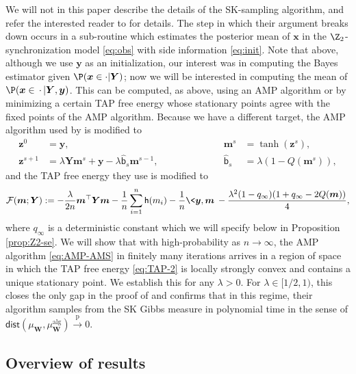 \documentclass[]{article}
\def\bx{{\boldsymbol x}}
\def\by{{\boldsymbol y}}
\def\bW{{\boldsymbol W}}
\def\cF{{\mathcal F}}
\def\bz{{\boldsymbol z}}
\def\bx{{\boldsymbol x}}
\def\by{{\boldsymbol y}}
\def\bW{{\boldsymbol W}}
\def\cF{{\mathcal F}}
\def\bz{{\boldsymbol z}}
\def\bY{{\boldsymbol Y}}
\def\bbm{{\boldsymbol m}}
\def\sh{{\mathsf h}}
\def\pconv{\stackrel{\mathrm{p}}\rightarrow}
\def\sbhat{\widehat{\mathsf{b}}{}}
\def\alg{\mathrm{alg}}
\def\dist{\mathsf{dist}}
\begin{document}
We will not in this paper describe the details of the SK-sampling algorithm, and refer the interested reader to \cite{AlaouiMontanariSelke2022} for details.
The step in which their argument breaks down occurs in a sub-routine which estimates the posterior mean of $\bx$ in the $\Z_2$-synchronization model \eqref{eq:obs} with side information \eqref{eq:init}.
Note that above, although we use $\by$ as an initialization, 
our interest was in computing the Bayes estimator given $\P(\bx \in \cdot | \bY)$;
now we will be interested in computing the mean of $\P(\bx \in \,\cdot\, | \bY , \by)$.
This can be computed,
as above, using an AMP algorithm or by minimizing a certain TAP free energy whose stationary points agree with the fixed points of the AMP algorithm.
Because we have a different target, 
the AMP algorithm used by \cite{AlaouiMontanariSelke2022} is modified to
\begin{equation}\label{eq:AMP-AMS}
\begin{aligned}
    \bz^0 &= \by,
    \qquad\qquad\qquad&
    \bbm^s &= \tanh(\bz^s),
    \\
    \bz^{s+1} &= \lambda \bY \bbm^s + \by - \lambda \sbhat_s\bbm^{s-1},
    \qquad\qquad\qquad
    &
    \sbhat_s &= \lambda(1 - Q(\bbm^s)),
\end{aligned}
\end{equation}
and the TAP free energy they use is modified to
\begin{equation}
\label{eq:TAP-2}
    \cF(\bbm;\bY)   
        := 
        - \frac{\lambda}{2n} \bbm^\top \bY \bbm
        - \frac1n \sum_{i=1}^n \sh(m_i) 
        - \frac1n \< \by,\bbm\>
        - \frac{\lambda^2(1-q_\infty)(1+q_\infty-2Q(\bbm))}{4},
\end{equation}
where $q_\infty$ is a deterministic constant which we will specify below in Proposition \ref{prop:Z2-se}.
We will show that with high-probability as $n \rightarrow \infty$,
the AMP algorithm \eqref{eq:AMP-AMS} in finitely many iterations arrives in a region of space in which the TAP free energy \eqref{eq:TAP-2} is locally strongly convex and contains a unique stationary point. 
We establish this for any $\lambda > 0$. 
For $\lambda \in [1/2,1)$,
this closes the only gap in the proof of \cite{AlaouiMontanariSelke2022} and confirms that in this regime,
their algorithm samples from the SK Gibbs measure in polynomial time in the sense of 
$\dist(\mu_\bW,\mu_\bW^\alg) \pconv 0$.


\subsection{Overview of results}
\label{sec:overview}
\end{document}
